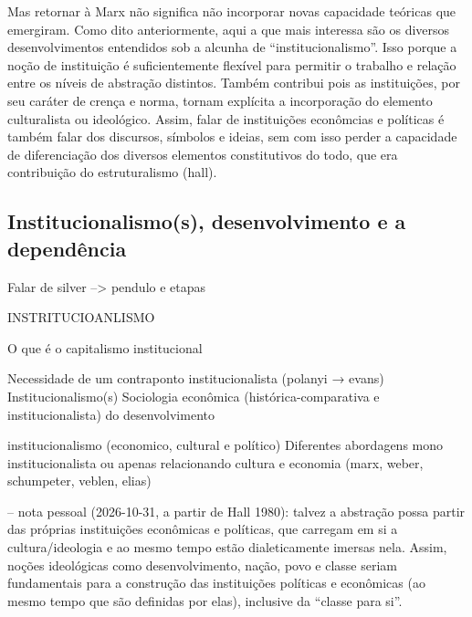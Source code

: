 Mas retornar à Marx não significa não incorporar novas capacidade teóricas que emergiram. Como dito anteriormente, aqui a que mais interessa são os diversos desenvolvimentos entendidos sob a alcunha de ``institucionalismo''. Isso porque a noção de instituição é suficientemente flexível para permitir o trabalho e relação entre os níveis de abstração distintos. Também contribui pois as instituições, por seu caráter de crença e norma, tornam explícita a incorporação do elemento culturalista ou ideológico. Assim, falar de instituições econômcias e políticas é também falar dos discursos, símbolos e ideias, sem com isso perder a capacidade de diferenciação dos diversos elementos constitutivos do todo, que era contribuição do estruturalismo (hall).




\subsection{Institucionalismo(s), desenvolvimento e a dependência}
Falar de silver --> pendulo e etapas

INSTRITUCIOANLISMO


O que é o capitalismo institucional




Necessidade de um contraponto institucionalista (polanyi → evans)
Institucionalismo(s)
Sociologia econômica (histórica-comparativa e institucionalista) do
desenvolvimento

institucionalismo (economico, cultural e político)
Diferentes abordagens mono institucionalista ou apenas relacionando
cultura e economia (marx, weber, schumpeter, veblen, elias)

-- nota pessoal (2026-10-31, a partir de Hall 1980): talvez a abstração possa partir das próprias instituições econômicas e políticas, que carregam em si a cultura/ideologia e ao mesmo tempo estão dialeticamente imersas nela. Assim, noções ideológicas como desenvolvimento, nação, povo e classe seriam fundamentais para a construção das instituições políticas e econômicas (ao mesmo tempo que são definidas por elas), inclusive da ``classe para si''.

